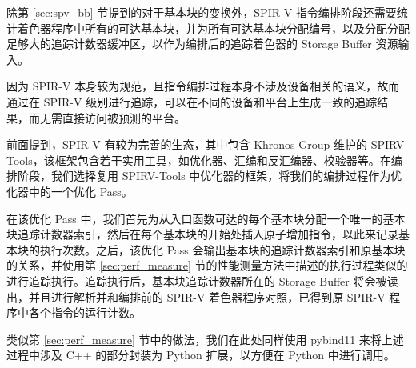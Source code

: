 除第 \ref{sec:spv_bb} 节提到的对于基本块的变换外，SPIR-V 指令编排阶段还需要统计着色器程序中所有的可达基本块，并为所有可达基本块分配编号，以及分配分配足够大的追踪计数器缓冲区，以作为编排后的追踪着色器的 Storage Buffer 资源输入。

因为 SPIR-V 本身较为规范，且指令编排过程本身不涉及设备相关的语义，故而通过在 SPIR-V 级别进行追踪，可以在不同的设备和平台上生成一致的追踪结果，而无需直接访问被预测的平台。

前面提到，SPIR-V 有较为完善的生态，其中包含 Khronos Group 维护的 SPIRV-Tools，该框架包含若干实用工具，如优化器、汇编和反汇编器、校验器等。在编排阶段，我们选择复用 SPIRV-Tools 中优化器的框架，将我们的编排过程作为优化器中的一个优化 Pass。

在该优化 Pass 中，我们首先为从入口函数可达的每个基本块分配一个唯一的基本块追踪计数器索引，然后在每个基本块的开始处插入原子增加指令，以此来记录基本块的执行次数。之后，该优化 Pass 会输出基本块的追踪计数器索引和原基本块的关系，并使用第 \ref{sec:perf_measure} 节的性能测量方法中描述的执行过程类似的进行追踪执行。追踪执行后，基本块追踪计数器所在的 Storage Buffer 将会被读出，并且进行解析并和编排前的 SPIR-V 着色器程序对照，已得到原 SPIR-V 程序中各个指令的运行计数。

类似第 \ref{sec:perf_measure} 节中的做法，我们在此处同样使用 pybind11 来将上述过程中涉及 C++ 的部分封装为 Python 扩展，以方便在 Python 中进行调用。

